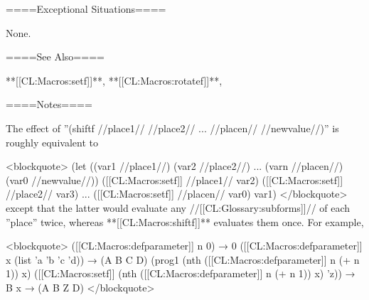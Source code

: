====Exceptional Situations====

None.

====See Also====

**[[CL:Macros:setf]]**, **[[CL:Macros:rotatef]]**, {\secref\GeneralizedReference}

====Notes====

The effect of ''(shiftf //place1// //place2// ... //placen// //newvalue//)'' is roughly equivalent to

<blockquote> (let ((var1 //place1//) (var2 //place2//) ... (varn //placen//) (var0 //newvalue//)) ([[CL:Macros:setf]] //place1// var2) ([[CL:Macros:setf]] //place2// var3) ... ([[CL:Macros:setf]] //placen// var0) var1) </blockquote> except that the latter would evaluate any //[[CL:Glossary:subforms]]// of each ''place'' twice, whereas **[[CL:Macros:shiftf]]** evaluates them once. For example,

<blockquote> ([[CL:Macros:defparameter]] n 0) → 0 ([[CL:Macros:defparameter]] x (list 'a 'b 'c 'd)) → (A B C D) (prog1 (nth ([[CL:Macros:defparameter]] n (+ n 1)) x) ([[CL:Macros:setf]] (nth ([[CL:Macros:defparameter]] n (+ n 1)) x) 'z)) → B x → (A B Z D) </blockquote>

 
